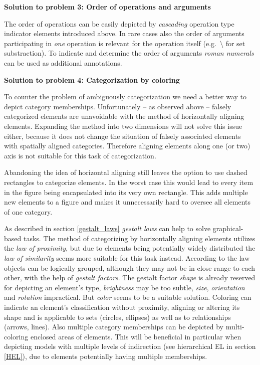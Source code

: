 \documentclass[twoside, openright, 12pt]{book}
\begin{document}
\vspace{2mm}
\noindent
\textbf{Solution to problem 3: Order of operations and arguments}
\vspace{1mm}

\noindent
The order of operations can be easily depicted by \textit{cascading} operation type indicator elements introduced above.
In rare cases also the order of arguments participating in \textit{one} operation is relevant for the operation itself (e.g.~$\setminus$ for set substraction).
To indicate and determine the order of arguments \textit{roman numerals} can be used as additional annotations.



\vspace{4mm}
\noindent
\textbf{Solution to problem 4: Categorization by coloring}
\vspace{1mm}

\noindent
To counter the problem of ambiguously categorization we need a better way to depict category memberships.
Unfortunately -- as observed above -- falsely categorized elements are unavoidable with the method of horizontally aligning elements.
Expanding the method into two dimensions will not solve this issue either, because it does not change the situation of falsely associated elements with spatially aligned categories.
Therefore aligning elements along one (or two) axis is not suitable for this task of categorization.

Abandoning the idea of horizontal aligning still leaves the option to use dashed rectangles to categorize elements.
In the worst case this would lead to every item in the figure being encapsulated into its very own rectangle.
This adds multiple new elements to a figure and makes it unnecessarily hard to oversee all elements of one category.

As described in section \ref{gestalt_laws} \textit{gestalt laws} can help to solve graphical-based tasks.
The method of categorizing by horizontally aligning elements utilizes the \textit{law of proximity}, but due to elements being potentially widely distributed the \textit{law of similarity} seems more suitable for this task instead.
According to the law objects can be logically grouped, although they may not be in close range to each other, with the help of \textit{gestalt factors}.
The gestalt factor \textit{shape} is already reserved for depicting an element's type, \textit{brightness} may be too subtle, \textit{size}, \textit{orientation} and \textit{rotation} impractical.
But \textit{color} seems to be a suitable solution.
Coloring can indicate an element's classification without proximity, aligning or altering its shape and is applicable to sets (circles, ellipses) as well as to relationships (arrows, lines).
Also multiple category memberships can be depicted by multi-coloring enclosed areas of elements.
This will be beneficial in particular when depicting models with multiple levels of indirection (see hierarchical EL in section \ref{HEL}), due to elements potentially having multiple memberships.
\end{document}
